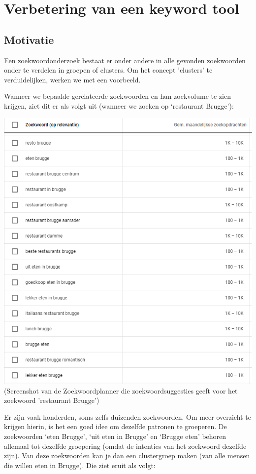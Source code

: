 \chapter{Verbetering van een keyword tool}
\label{ch:Verbetering van een keyword tool}

\section{Motivatie}
\label{ch: Motivatie}

Een zoekwoordonderzoek bestaat er onder andere in alle gevonden zoekwoorden onder te verdelen in groepen of clusters. Om het concept  'clusters' te verduidelijken, werken we met een voorbeeld.

Wanneer we bepaalde gerelateerde zoekwoorden en hun zoekvolume te zien krijgen, ziet dit er als volgt uit (wanneer we zoeken op ‘restaurant Brugge’): 

\includegraphics[width=\linewidth]{Bachelorproef/bachelor/img/Keywordplannervoorbeeld.png}
(Screenshot van de Zoekwoordplanner die zoekwoordsuggesties geeft voor het zoekwoord 'restaurant Brugge')

Er zijn vaak honderden, soms zelfs duizenden zoekwoorden. Om meer overzicht te krijgen hierin, is het een goed idee om dezelfde patronen te groeperen. De zoekwoorden ‘eten Brugge’, ‘uit eten in Brugge’ en ‘Brugge eten’ behoren allemaal tot dezelfde groepering (omdat de intenties van het zoekwoord dezelfde zijn). Van deze zoekwoorden kan je dan een clustergroep maken (van alle mensen die willen eten in Brugge). Die ziet eruit als volgt:

